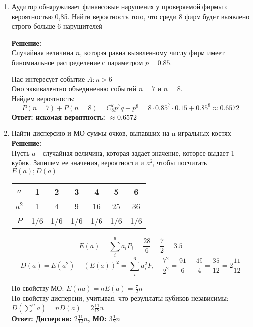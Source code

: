 \documentclass[a4paper,12pt]{article}
\begin{document}
\begin{enumerate}
\item Аудитор обнаруживает финансовые нарушения у проверяемой фирмы с вероятностью 0,85. Найти вероятность того, что среди 8 фирм будет выявлено строго больше 6 нарушителей 

\textbf{Решение:}\\
Случайная величина $n$, которая равна выявленному числу фирм имеет биномиальное распределение с параметром $p=0.85$.

Нас интересует событие $A: n>6$\\
Оно эквивалентно объединению событий $n=7$ и $n=8$.\\
Найдем вероятность:
$$P(n=7)+P(n=8)=C^7_8p^7q+p^8=8 \cdot 0.85^7 \cdot 0.15 +0.85^8\approx0.6572$$
\textbf{Ответ: искомая вероятность: $\approx0.6572$}


\item Найти дисперсию и МО суммы очков, выпавших на n игральных костях\\
\textbf{Решение:}\\
Пусть $a$ - случайная величина, которая задает значение, которое выдает 1 кубик. Запишем ее значения, вероятности и $a^2$, чтобы посчитать $E(a); D(a)$
\begin{center}
 \begin{tabular}{|c| c| c| c|c|c|c|} 
 \hline
 $a$ & 1 & 2 & 3 & 4 & 5& 6\\ 
 \hline
  $a^2$ & 1 & 4 & 9 & 16 & 25& 36\\ 
 \hline
$P$ & 1/6 & 1/6 & 1/6 & 1/6 & 1/6& 1/6\\ 
\hline
\end{tabular}
\end{center}
$$E(a)=\sum_i^{6} {a_i P_i} = \frac{28}{6}=\frac{7}{2}=3.5$$
$$D(a)=E(a^2) - (E(a))^2=\sum_i^{6} {a^2_i P_i}-\frac{7^2}{2^2} = \frac{91}{6}-\frac{49}{4}=\frac{35}{12}=2\frac{11}{12}$$

По свойству МО: $E(n a) = nE(a) = \frac{7}{2}n$\\
По свойству дисперсии, учитывая, что результаты кубиков независимы:\\ $D(\sum^n a) = n D(a) = 2\frac{11}{12}n$\\
\textbf{Ответ: Дисперсия: $2\frac{11}{12}n$, МО: $3\frac{1}{2}n$}


\end{enumerate}
\end{document}
